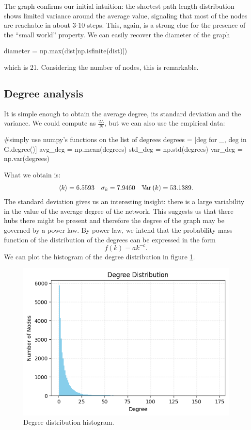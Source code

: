 \documentclass[12pt]{article}
\begin{document}
The graph confirms our initial intuition: the shortest path length distribution shows limited variance around the average value, signaling that most of the nodes are reachable in about 3-10 steps. This, again, is a strong clue for the presence of the ``small world'' property. We can easily recover the diameter of the graph
\begin{py}
	diameter = np.max(dist[np.isfinite(dist)])
\end{py}
which is 21. Considering the number of nodes, this is remarkable.
\subsection{Degree analysis}
It is simple enough to obtain the average degree, its standard deviation and the variance. We could compute as $\frac{2L}{N}$, but we can also use the empirical data:
\begin{py}
	#simply use numpy's functions on the list of degrees
	degrees = [deg for _, deg in G.degree()]
	avg_deg = np.mean(degrees)
	std_deg = np.std(degrees)
	var_deg = np.var(degrees)
\end{py}
What we obtain is:
\begin{equation*}
	\langle k\rangle=6.5593\quad\sigma_{k}=7.9460\quad\mathbb{V}\!\mathrm{ar}\,(k)=53.1389.
\end{equation*}
The standard deviation gives us an interesting insight: there is a large variability in the value of the average degree of the network. This suggests us that there hubs there might be present and therefore the degree of the graph may be governed by a power law. By power law, we intend that the probability mass function of the distribution of the degrees can be expressed in the form
\begin{equation*}
	f(k)=ak^{-c}.
\end{equation*}
We can plot the histogram of the degree distribution in figure \ref{fig:screenshot002}.
\begin{figure}[h]
	\centering
	\includegraphics[width=0.6\linewidth]{screenshot002}
	\caption{Degree distribution histogram.}
	\label{fig:screenshot002}
\end{figure}
\end{document}
